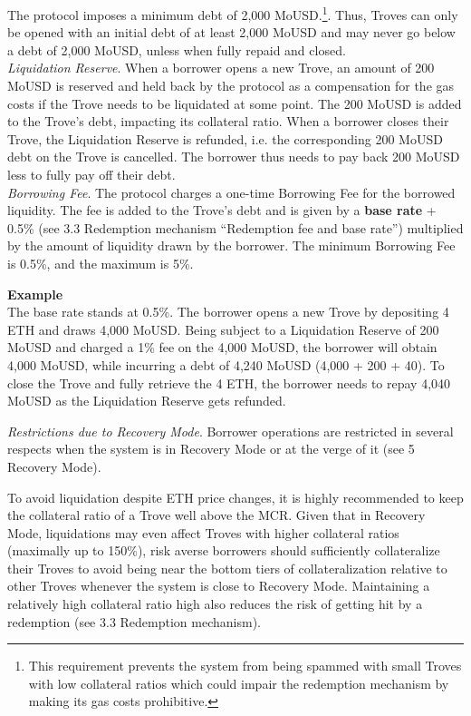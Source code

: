 \documentclass{article}
\begin{document}
The protocol imposes a minimum debt of 2,000 MoUSD.\footnote{This requirement prevents the system from being spammed with small Troves with low collateral ratios which could impair the redemption mechanism by making its gas costs prohibitive.}. Thus, Troves can only be opened with an initial debt of at least 2,000 MoUSD and may never go below a debt of 2,000 MoUSD, unless when fully repaid and closed.
\\


\textit{Liquidation Reserve}. When a borrower opens a new Trove, an amount of 200 MoUSD is reserved and held back by the protocol as a compensation for the gas costs if the Trove needs to be liquidated at some point. The 200 MoUSD is added to the Trove's debt, impacting its collateral ratio. When a borrower closes their Trove, the Liquidation Reserve is refunded, i.e. the corresponding 200 MoUSD debt on the Trove is cancelled. The borrower thus needs to pay back 200 MoUSD less to fully pay off their debt. \\

\textit{Borrowing Fee}.   The protocol charges a one-time Borrowing Fee for the borrowed liquidity. The fee is added to the Trove's debt and is given by a \textbf{base rate} + 0.5\% (see 3.3 Redemption mechanism “Redemption fee and base rate”) multiplied by the amount of liquidity drawn by the borrower. The minimum Borrowing Fee is 0.5\%, and the maximum is 5\%. \\

\begin{tcolorbox}
\textbf{Example}\\
The base rate stands at 0.5\%. The borrower opens a new Trove by depositing 4 ETH and draws 4,000 MoUSD. Being subject to a Liquidation Reserve of 200 MoUSD and charged a 1\% fee on the 4,000 MoUSD, the borrower will obtain 4,000 MoUSD, while incurring a debt of 4,240 MoUSD (4,000 + 200 + 40). To close the Trove and fully retrieve the 4 ETH, the borrower needs to repay 4,040 MoUSD as the Liquidation Reserve gets refunded.
\end{tcolorbox}

\textit{Restrictions due to Recovery Mode}.   Borrower operations are restricted in several respects when the system is in Recovery Mode or at the verge of it (see 5 Recovery Mode). 

To avoid liquidation despite ETH price changes, it is highly recommended to keep the collateral ratio of a Trove well above the MCR. Given that in Recovery Mode, liquidations may even affect Troves with higher collateral ratios (maximally up to 150\%), risk averse borrowers should sufficiently collateralize their Troves to avoid being near the bottom tiers of collateralization relative to other Troves whenever the system is close to Recovery Mode. Maintaining a relatively high collateral ratio high also reduces the risk of getting hit by a redemption (see 3.3 Redemption mechanism).
\end{document}
